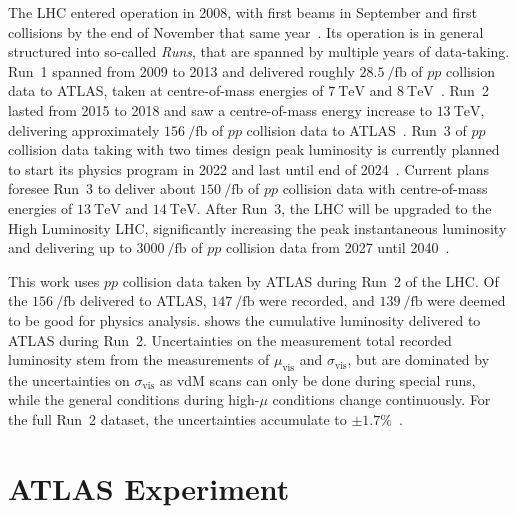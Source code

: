 The LHC entered operation in 2008, with first beams in September and first collisions by the end of November that same year~\cite{startup}. Its operation is in general structured into so-called \textit{Runs}, that are spanned by multiple years of data-taking. Run~1 spanned from 2009 to 2013 and delivered roughly $\SI{28.5}{\per\femto\barn}$ of $pp$ collision data to ATLAS, taken at centre-of-mass energies of $\SI{7}{\TeV}$ and $\SI{8}{\TeV}$~\cite{Aad:2011dr,Aad:1517411,Aaboud:2016hhf}. Run~2 lasted from 2015 to 2018 and saw a centre-of-mass energy increase to $\SI{13}{\TeV}$, delivering approximately $\SI{156}{\per\femto\barn}$ of $pp$ collision data to ATLAS~\cite{ATLAS-CONF-2019-021}. Run~3 of $pp$ collision data taking with two times design peak luminosity is currently planned to start its physics program in 2022 and last until end of 2024~\cite{run3}. Current plans foresee Run~3 to deliver about $\SI{150}{\per\femto\barn}$ of $pp$ collision data with centre-of-mass energies of $\SI{13}{\TeV}$ and $\SI{14}{\TeV}$. After Run~3, the LHC will be upgraded to the High Luminosity LHC, significantly increasing the peak instantaneous luminosity and delivering up to $\SI{3000}{\per\femto\barn}$ of $pp$ collision data from 2027 until 2040~\cite{run3,Apollinari:2284929}. 

This work uses $pp$ collision data taken by ATLAS during Run~2 of the LHC. Of the $\SI{156}{\per\femto\barn}$ delivered to ATLAS, $\SI{147}{\per\femto\barn}$ were recorded, and $\SI{139}{\per\femto\barn}$ were deemed to be good for physics analysis.  shows the cumulative luminosity delivered to ATLAS during Run~2. Uncertainties on the measurement total recorded luminosity stem from the measurements of $\mu_\mathrm{vis}$ and $\sigma_\mathrm{vis}$, but are dominated by the uncertainties on $\sigma_\mathrm{vis}$ as vdM scans can only be done during special runs, while the general conditions during high-$\mu$ conditions change continuously. For the full Run~2 dataset, the uncertainties accumulate to $\pm 1.7 \%$~\cite{ATLAS-CONF-2019-021}.

\section{ATLAS Experiment}\label{sec:atlas_experiment}

